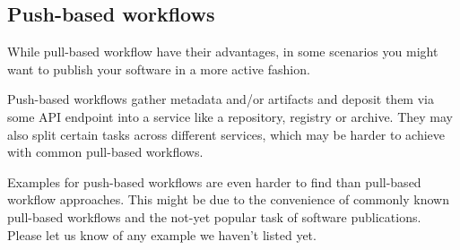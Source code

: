 \documentclass{article}
\begin{document}
\subsection{Push-based workflows}\label{ogbzdahy00bw}
While pull-based workflow have their advantages, in some scenarios you might want to publish your software in a more active fashion.

Push-based workflows gather metadata and/or artifacts and deposit them via some API endpoint into a service like a repository, registry or archive. They may also split certain tasks across different services, which may be harder to achieve with common pull-based workflows.

Examples for push-based workflows are even harder to find than pull-based workflow approaches. This might be due to the convenience of commonly known pull-based workflows and the not-yet popular task of software publications. Please let us know of any example we haven’t listed yet.
\end{document}

